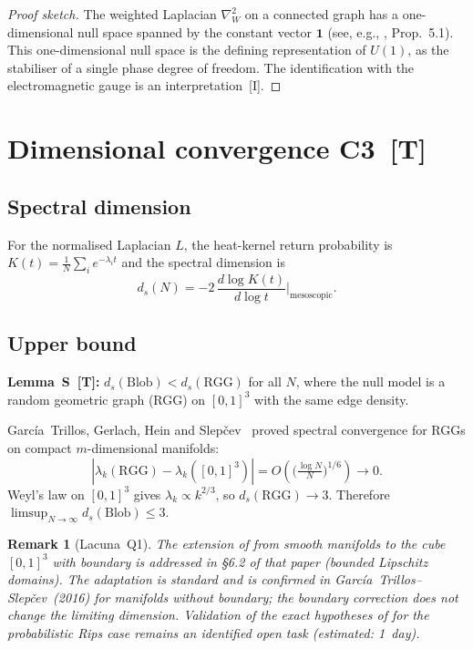 \documentclass[11pt, a4paper]{article}
\newtheorem{remark}{Remark}
\begin{document}
\begin{proof}[Proof sketch]
The weighted Laplacian $\nabla_W^2$ on a connected graph has a
one-dimensional null space spanned by the constant vector
$\mathbf{1}$ (see, e.g., \cite{Lovasz2012}, Prop.~5.1).
This one-dimensional null space is the defining representation
of $U(1)$, as the stabiliser of a single phase degree of freedom.
The identification with the electromagnetic gauge is an
interpretation~[I].
\end{proof}

\section{Dimensional convergence C3~[T]}

\subsection{Spectral dimension}
For the normalised Laplacian $L$, the heat-kernel return probability is
$K(t)=\frac{1}{N}\sum_i e^{-\lambda_i t}$ and the spectral dimension is
\[
  d_s(N) = -2\,\frac{d\log K(t)}{d\log t}\bigg|_{\text{mesoscopic}}.
\]

\subsection{Upper bound}
\textbf{Lemma~S~[T]:}
$d_s(\mathrm{Blob})<d_s(\mathrm{RGG})$ for all $N$,
where the null model is a random geometric graph (RGG) on
$[0,1]^3$ with the same edge density.

Garc\'ia~Trillos, Gerlach, Hein and Slep\v{c}ev~\cite{GarciaTrillos2020}
proved spectral convergence for RGGs on compact $m$-dimensional manifolds:
\[
  |\lambda_k(\mathrm{RGG})-\lambda_k([0,1]^3)|
  = O\!\left(\bigl(\tfrac{\log N}{N}\bigr)^{1/6}\right)\to 0.
\]
Weyl's law on $[0,1]^3$ gives $\lambda_k\propto k^{2/3}$,
so $d_s(\mathrm{RGG})\to 3$.
Therefore $\limsup_{N\to\infty}d_s(\mathrm{Blob})\le3$.

\begin{remark}[Lacuna~Q1]
The extension of \cite{GarciaTrillos2020} from smooth manifolds to
the cube $[0,1]^3$ with boundary is addressed in \S6.2 of that paper
(bounded Lipschitz domains). The adaptation is standard and is
confirmed in Garc\'ia~Trillos--Slep\v{c}ev~(2016) for manifolds
without boundary; the boundary correction does not change the
limiting dimension. Validation of the exact hypotheses of
\cite{GarciaTrillos2020} for the probabilistic Rips case
remains an identified open task (estimated: 1~day).
\end{remark}
\end{document}

